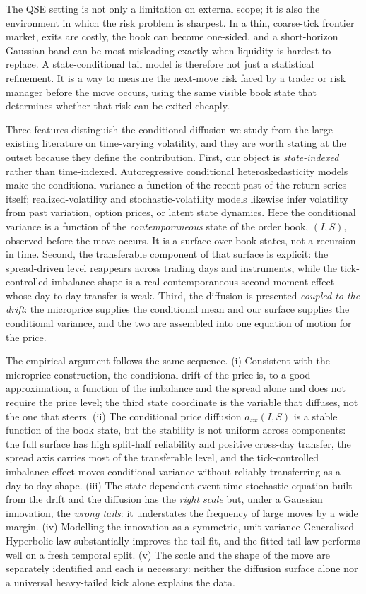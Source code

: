 \documentclass[11pt]{article}
\theoremstyle{plain}
\theoremstyle{definition}
\newcommand{\axx}{a_{xx}}
\begin{document}
The QSE setting is not only a limitation on external scope; it is also the environment in
which the risk problem is sharpest. In a thin, coarse-tick frontier market, exits are costly,
the book can become one-sided, and a short-horizon Gaussian band can be most misleading
exactly when liquidity is hardest to replace. A state-conditional tail model is therefore not
just a statistical refinement. It is a way to measure the next-move risk faced by a trader or
risk manager before the move occurs, using the same visible book state that determines whether
that risk can be exited cheaply.

Three features distinguish the conditional diffusion we study from the large
existing literature on time-varying volatility, and they are worth stating at the
outset because they define the contribution. First, our object is
\emph{state-indexed} rather than time-indexed. Autoregressive conditional
heteroskedasticity models \citep{engle1982,bollerslev1986} make the conditional
variance a function of the recent past of the return series itself; realized-volatility
and stochastic-volatility models likewise infer volatility from past variation,
option prices, or latent state dynamics. Here the conditional variance is a function
of the \emph{contemporaneous} state of the order book, $(I,S)$, observed before the
move occurs. It is a surface over book states, not a recursion in time. Second, the transferable component of that surface is explicit:
the spread-driven level reappears across trading days and instruments, while the
tick-controlled imbalance shape is a real contemporaneous second-moment effect whose
day-to-day transfer is weak. Third, the diffusion is presented \emph{coupled
to the drift}: the microprice supplies the conditional mean and our surface
supplies the conditional variance, and the two are assembled into one equation of
motion for the price.

The empirical argument follows the same sequence. (i) Consistent with the microprice construction, the
conditional drift of the price is, to a good approximation, a function of the
imbalance and the spread alone and does not require the price level; the third
state coordinate is the variable that diffuses, not the one that steers. (ii) The
conditional price diffusion $\axx(I,S)$ is a stable function of the book state, but the
stability is not uniform across components: the full surface has high split-half reliability
and positive cross-day transfer, the spread axis carries most of the transferable level, and
the tick-controlled imbalance effect moves conditional variance without reliably transferring
as a day-to-day shape.
(iii) The state-dependent event-time stochastic equation built from the drift
and the diffusion has the \emph{right scale} but, under a Gaussian innovation, the
\emph{wrong tails}: it understates the frequency of large moves by a wide margin.
(iv) Modelling the innovation as a symmetric, unit-variance Generalized Hyperbolic
law substantially improves the tail fit, and the fitted tail law performs well on a
fresh temporal split. (v) The scale
and the shape of the move are separately identified and each is necessary: neither
the diffusion surface alone nor a universal heavy-tailed kick alone explains the
data.
\end{document}

